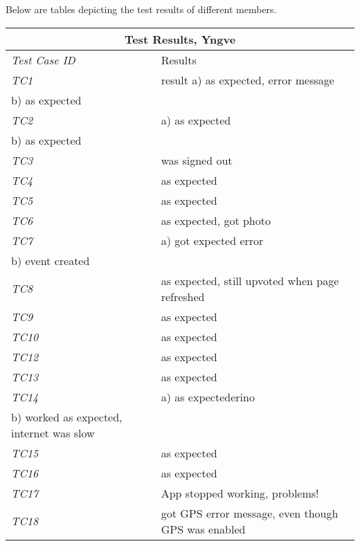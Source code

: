 Below are tables depicting the test results of different members. 
%
\begin{minipage}{\linewidth}
\setlength{\tabcolsep}{15pt}
\centering
{}
\begin{tabular}{ |l|p{70mm}| }
	\hline
	\multicolumn{2}{|c|}{\cellcolor{gray!25} \textbf{Test Results, Yngve}} \\
	\hline
	\it{\cellcolor{gray!25}Test Case ID} & {\cellcolor{gray!25} Results } \\
	\hline
	\it{\cellcolor{gray!25}TC1} & result a) as expected, error message
\\b) as expected \\ \hline
	\it{\cellcolor{gray!25}TC2} & a) as expected
\\b) as expected \\ \hline
	\it{\cellcolor{gray!25}TC3} & was signed out \\ \hline
	\it{\cellcolor{gray!25}TC4} & as expected \\ \hline
	\it{\cellcolor{gray!25}TC5} & as expected \\ \hline
	\it{\cellcolor{gray!25}TC6} & as expected, got photo \\ \hline
	\it{\cellcolor{gray!25}TC7} & a) got expected error
\\b) event created \\ \hline
	\it{\cellcolor{gray!25}TC8} & as expected, still upvoted when page refreshed \\ \hline
	\it{\cellcolor{gray!25}TC9} & as expected \\ \hline
	\it{\cellcolor{gray!25}TC10} & as expected \\ \hline
	\it{\cellcolor{gray!25}TC12} & as expected \\ \hline
	\it{\cellcolor{gray!25}TC13} & as expected \\ \hline
	\it{\cellcolor{gray!25}TC14} & a) as expectederino
\\b) worked as expected, internet was slow \\ \hline
	\it{\cellcolor{gray!25}TC15} & as expected \\ \hline
	\it{\cellcolor{gray!25}TC16} & as expected \\ \hline
	\it{\cellcolor{gray!25}TC17} & App stopped working, problems! \\ \hline
	\it{\cellcolor{gray!25}TC18} & got GPS error message, even though GPS was enabled \\ \hline
	\hline
\end{tabular}
\medskip
\end{minipage}
